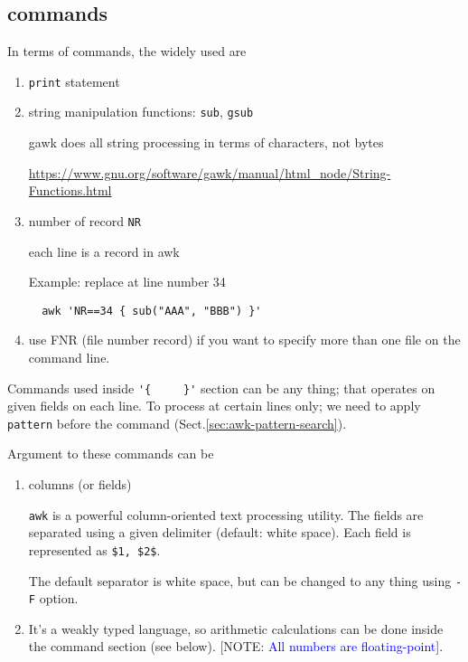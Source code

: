 \subsection{commands}
\label{sec:awk-commands}

In terms of commands, the widely used are
\begin{enumerate}
  \item \verb!print! statement
  
  \item string manipulation functions: \verb!sub!, \verb!gsub!
  
  gawk does all string processing in terms of characters, not bytes
  
  \url{https://www.gnu.org/software/gawk/manual/html_node/String-Functions.html}
  
  \item number of record \verb!NR!
  
  each line is a record in awk
  
  Example: replace at line number 34
  \begin{verbatim}
  awk 'NR==34 { sub("AAA", "BBB") }'
  \end{verbatim}
  
  \item use FNR (file number record) if you want to specify more than one file
  on the command line.
  
  
\end{enumerate}

Commands used inside \verb!'{     }'! section can be any thing; that operates on
given fields on each line. To process at certain lines only; we need to apply
\verb!pattern! before the command (Sect.\ref{sec:awk-pattern-search}).


Argument to these commands can be
\begin{enumerate}
  \item columns (or fields)

\verb!awk! is a powerful column-oriented text processing utility. The fields are
separated using a given delimiter (default:
white space). Each field is represented as \verb!$1, $2$!. 
  
The default separator is white space, but can be changed to any thing using
\verb!-F! option.
  
  \item It's a weakly typed language, so arithmetic calculations can be done
  inside the command section (see below). [NOTE: \textcolor{blue}{All numbers
  are floating-point}]. 
\end{enumerate}

